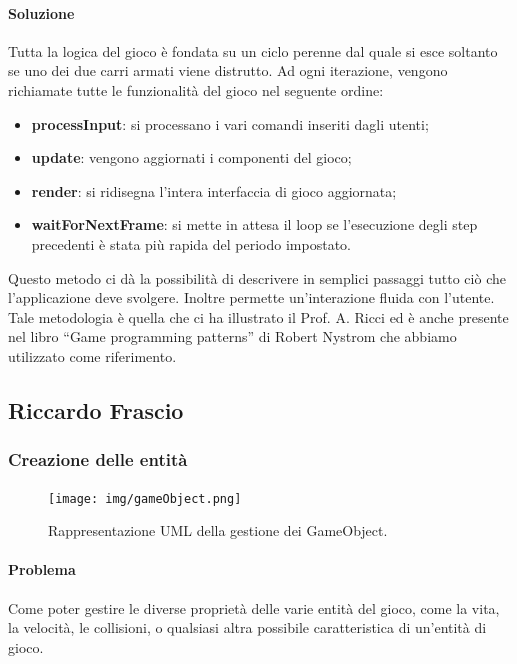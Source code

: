 \documentclass[a4paper,12pt]{report}
\begin{document}
\paragraph*{Soluzione} Tutta la logica del gioco è fondata su un ciclo perenne dal quale si esce soltanto se uno dei due carri armati viene distrutto. Ad ogni iterazione, vengono richiamate tutte le funzionalità del gioco nel seguente ordine:
\begin{itemize}
	\item \textbf{processInput}:
	si processano i vari comandi inseriti dagli utenti;
	\item \textbf{update}:
	vengono aggiornati i componenti del gioco;
	\item \textbf{render}:
	si ridisegna l’intera interfaccia di gioco aggiornata;
	\item \textbf{waitForNextFrame}:
	si mette in attesa il loop se l’esecuzione degli step precedenti è stata più rapida del periodo impostato.
\end{itemize}
Questo metodo ci dà la possibilità di descrivere in semplici passaggi tutto ciò che l’applicazione deve svolgere. Inoltre permette un’interazione fluida con l’utente.
Tale metodologia è quella che ci ha illustrato il Prof. A. Ricci ed è anche presente nel libro “Game programming patterns” di Robert Nystrom che abbiamo utilizzato come riferimento.
%
\newpage
\subsection*{Riccardo Frascio}
%
\subsubsection*{Creazione delle entità}
%
\begin{figure}[H]
	\centering{}
	\texttt{[image: img/gameObject.png]}
	\caption{Rappresentazione UML della gestione dei GameObject.}
	\end{figure}
%
\paragraph*{Problema} Come poter gestire le diverse proprietà delle varie entità del gioco, come la vita, la velocità, le collisioni, o qualsiasi altra possibile caratteristica di un’entità di gioco.
\end{document}
